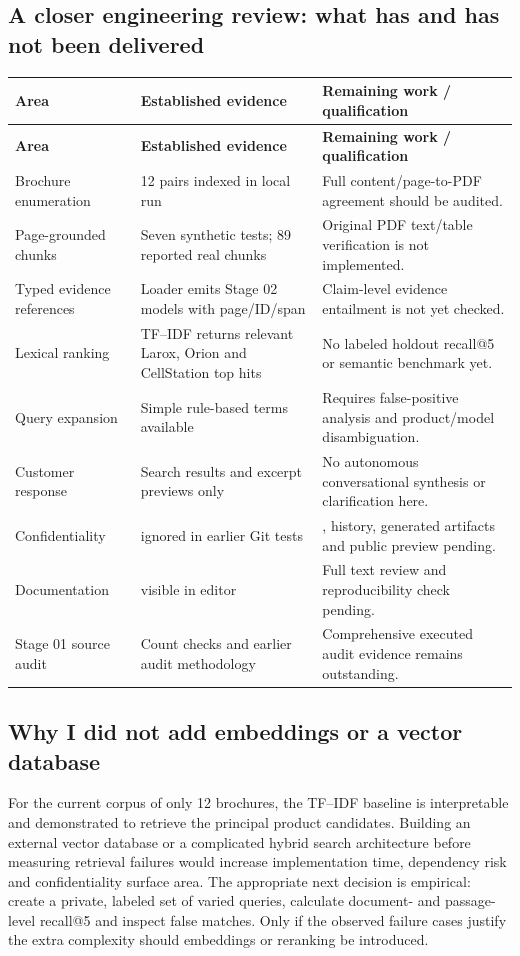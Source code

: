 \documentclass[11pt,a4paper]{article}
\DeclareRobustCommand{\code}[1]{{\ttfamily\small\detokenize{#1}}}
\begin{document}
\subsection{A closer engineering review: what has and has not been delivered}
\begin{longtable}{@{}L{45mm}L{47mm}L{52mm}@{}}
\toprule\textbf{Area} & \textbf{Established evidence} & \textbf{Remaining work / qualification}\\
\midrule\endfirsthead
\toprule\textbf{Area} & \textbf{Established evidence} & \textbf{Remaining work / qualification}\\
\midrule\endhead
Brochure enumeration & 12 pairs indexed in local run & Full content/page-to-PDF agreement should be audited.\\
Page-grounded chunks & Seven synthetic tests; 89 reported real chunks & Original PDF text/table verification is not implemented.\\
Typed evidence references & Loader emits Stage 02 models with page/ID/span & Claim-level evidence entailment is not yet checked.\\
Lexical ranking & TF--IDF returns relevant Larox, Orion and CellStation top hits & No labeled holdout recall@5 or semantic benchmark yet.\\
Query expansion & Simple rule-based terms available & Requires false-positive analysis and product/model disambiguation.\\
Customer response & Search results and excerpt previews only & No autonomous conversational synthesis or clarification here.\\
Confidentiality & \code{raw/} ignored in earlier Git tests & \code{git ls-files}, history, generated artifacts and public preview pending.\\
Documentation & \code{product_retrieval.md} visible in editor & Full text review and reproducibility check pending.\\
Stage 01 source audit & Count checks and earlier audit methodology & Comprehensive executed audit evidence remains outstanding.\\
\bottomrule
\end{longtable}

\subsection{Why I did not add embeddings or a vector database}
For the current corpus of only 12 brochures, the TF--IDF baseline is interpretable and demonstrated to retrieve the principal product candidates. Building an external vector database or a complicated hybrid search architecture before measuring retrieval failures would increase implementation time, dependency risk and confidentiality surface area. The appropriate next decision is empirical: create a private, labeled set of varied queries, calculate document- and passage-level recall@5 and inspect false matches. Only if the observed failure cases justify the extra complexity should embeddings or reranking be introduced.
\end{document}
